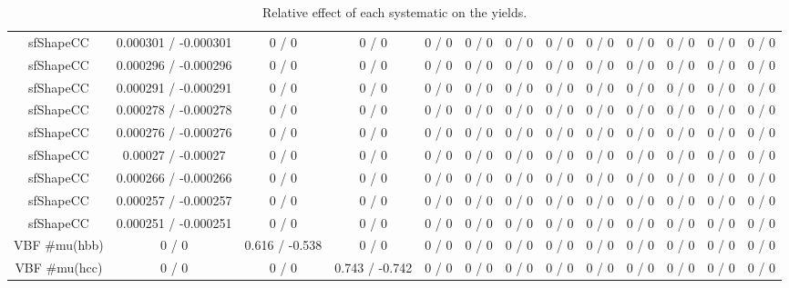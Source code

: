 \documentclass[10pt]{article}
\begin{document}
\begin{table}[htbp]
\begin{center}
\begin{tabular}{|c|c|c|c|c|c|c|c|c|c|c|c|c|}
  sfShapeCC & 0.000301 / -0.000301 & 0 / 0 & 0 / 0 & 0 / 0 & 0 / 0 & 0 / 0 & 0 / 0 & 0 / 0 & 0 / 0 & 0 / 0 & 0 / 0 & 0 / 0 \\ 
  sfShapeCC & 0.000296 / -0.000296 & 0 / 0 & 0 / 0 & 0 / 0 & 0 / 0 & 0 / 0 & 0 / 0 & 0 / 0 & 0 / 0 & 0 / 0 & 0 / 0 & 0 / 0 \\ 
  sfShapeCC & 0.000291 / -0.000291 & 0 / 0 & 0 / 0 & 0 / 0 & 0 / 0 & 0 / 0 & 0 / 0 & 0 / 0 & 0 / 0 & 0 / 0 & 0 / 0 & 0 / 0 \\ 
  sfShapeCC & 0.000278 / -0.000278 & 0 / 0 & 0 / 0 & 0 / 0 & 0 / 0 & 0 / 0 & 0 / 0 & 0 / 0 & 0 / 0 & 0 / 0 & 0 / 0 & 0 / 0 \\ 
  sfShapeCC & 0.000276 / -0.000276 & 0 / 0 & 0 / 0 & 0 / 0 & 0 / 0 & 0 / 0 & 0 / 0 & 0 / 0 & 0 / 0 & 0 / 0 & 0 / 0 & 0 / 0 \\ 
  sfShapeCC & 0.00027 / -0.00027 & 0 / 0 & 0 / 0 & 0 / 0 & 0 / 0 & 0 / 0 & 0 / 0 & 0 / 0 & 0 / 0 & 0 / 0 & 0 / 0 & 0 / 0 \\ 
  sfShapeCC & 0.000266 / -0.000266 & 0 / 0 & 0 / 0 & 0 / 0 & 0 / 0 & 0 / 0 & 0 / 0 & 0 / 0 & 0 / 0 & 0 / 0 & 0 / 0 & 0 / 0 \\ 
  sfShapeCC & 0.000257 / -0.000257 & 0 / 0 & 0 / 0 & 0 / 0 & 0 / 0 & 0 / 0 & 0 / 0 & 0 / 0 & 0 / 0 & 0 / 0 & 0 / 0 & 0 / 0 \\ 
  sfShapeCC & 0.000251 / -0.000251 & 0 / 0 & 0 / 0 & 0 / 0 & 0 / 0 & 0 / 0 & 0 / 0 & 0 / 0 & 0 / 0 & 0 / 0 & 0 / 0 & 0 / 0 \\ 
  VBF #mu(hbb) & 0 / 0 & 0.616 / -0.538 & 0 / 0 & 0 / 0 & 0 / 0 & 0 / 0 & 0 / 0 & 0 / 0 & 0 / 0 & 0 / 0 & 0 / 0 & 0 / 0 \\ 
  VBF #mu(hcc) & 0 / 0 & 0 / 0 & 0.743 / -0.742 & 0 / 0 & 0 / 0 & 0 / 0 & 0 / 0 & 0 / 0 & 0 / 0 & 0 / 0 & 0 / 0 & 0 / 0 \\ 
\hline 
\end{tabular} 
\caption{Relative effect of each systematic on the yields.} 
\end{center} 
\end{table} 
\end{document}

